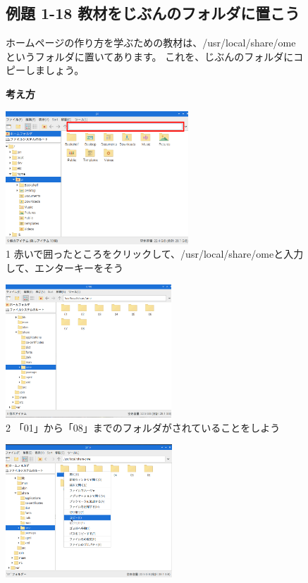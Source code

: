 \begin{figure}
\subsection{例題 1-18 教材をじぶんのフォルダに置こう}
ホームページの作り方を学ぶための教材は、/usr/local/share/omeというフォルダに置いてあります。
これを、じぶんのフォルダにコピーしましょう。

\textbf{考え方}

  \bigskip

  \centering
  \begin{minipage}{\textwidth}
    \begin{minipage}{0.45\linewidth}
      \includegraphics[height=5cm]{text01-img/textbook-img1010.png}\\
      1 赤いで囲ったところをクリックして、/usr/local/share/omeと入力して、エンターキーをそう
    \end{minipage}
    \hfill
    \vspace{20pt}
    \begin{minipage}{0.45\linewidth}
      \includegraphics[height=5cm]{text01-img/textbook-img1011.png}\\
      2 「01」から「08」までのフォルダがされていることをしよう
    \end{minipage}
    \begin{minipage}{0.45\linewidth}
      \includegraphics[height=5cm]{text01-img/textbook-img1012.png}\\

\end{minipage}
\end{minipage}
\end{figure}
